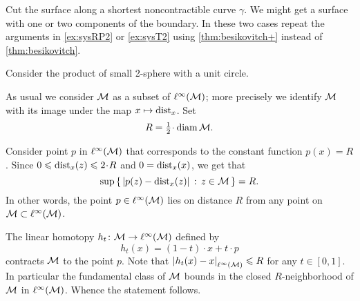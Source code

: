  Cut the surface along a shortest noncontractible curve $\gamma$. 
We might get a surface with one or two components of the boundary.
In these two cases repeat the arguments in \ref{ex:sysRP2} or \ref{ex:sysT2} using \ref{thm:besikovitch+} instead of \ref{thm:besikovitch}.


 Consider the product of small 2-sphere with a unit circle.

As usual we consider $\mathcal{M}$ as a subset of $\ell^\infty(\mathcal{M})$;
more precisely we identify $\mathcal{M}$ with its image under the map  $x\mapsto \mathrm{dist}_x$.
Set 
\[R=\tfrac12\cdot\diam\spc{M}.\]

Consider point $p$ in $\ell^\infty(\mathcal{M})$ that corresponds to the constant function $p(x)=R$.
Since $0\le \distfun_x(z)\le  2\cdot R$ and $0=\mathrm{dist}_x(x)$, we get that
\[\sup\left\{\,{|p(z)-\mathrm{dist}_x(z)|}\,:\,{z\in\mathcal{M}}\,\right\}=R.\]
In other words, the point $p\in \ell^\infty(\mathcal{M})$ lies on distance $R$ from any point on $\mathcal{M}\subset \ell^\infty(\mathcal{M})$.

The linear homotopy $h_t\colon\mathcal{M}\to \ell^\infty(\mathcal{M})$ defined by
\[h_t(x)=(1-t)\cdot x+t\cdot p\]
contracts $\mathcal{M}$ to the point $p$.
Note that $\dist{h_t(x)}{x}{\ell^\infty(\spc{M})}\le R$ for any $t\in[0,1]$.
In particular the fundamental class of $\mathcal{M}$ bounds in the closed $R$-neighborhood of $\mathcal{M}$ in $\ell^\infty(\mathcal{M})$.
Whence the statement follows.







